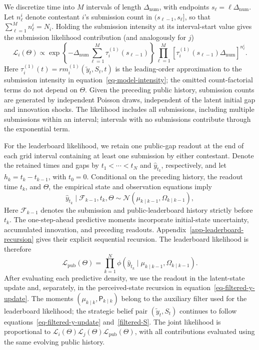 \documentclass[mnsc]{informs3}
\begin{document}
{We discretize time into $M$ intervals of length $\Delta_{\mathrm{num}}$, with endpoints $s_\ell=\ell\Delta_{\mathrm{num}}$. Let $n^i_\ell$ denote contestant $i$'s submission count in $(s_{\ell-1},s_\ell]$, so that $\sum_{\ell=1}^M n^i_\ell=N_i$. Holding the submission intensity at its interval-start value gives the submission likelihood contribution (and analogously for $j$)}
\begin{equation}\label{eq-ihpp-prob}
{\mathcal L_i(\Theta)
\propto
\exp\!\left\{-\Delta_{\mathrm{num}}\sum_{\ell=1}^M\tau_i^{(1)}(s_{\ell-1})\right\}
\prod_{\ell=1}^M
\left[\tau_i^{(1)}(s_{\ell-1})\Delta_{\mathrm{num}}\right]^{n^i_\ell}.}
\end{equation}
{Here $\tau_i^{(1)}(t)=r m_i^{(1)}(\tilde y_t,S_t,t)$ is the leading-order approximation to the submission intensity in equation~\eqref{eq-model-intensity}; the omitted count-factorial terms do not depend on $\Theta$. Given the preceding public history, submission counts are generated by independent Poisson draws, independent of the latent initial gap and innovation shocks. The likelihood includes all submissions, including multiple submissions within an interval; intervals with no submissions contribute through the exponential term.}

For the leaderboard likelihood, we retain one public-gap readout at the end of each grid interval containing at least one submission by either contestant. Denote the retained times and gaps by $t_1<\cdots<t_N$ and $\hat y_{t_k}$, respectively, and let $h_k=t_k-t_{k-1}$, with $t_0=0$. Conditional on the preceding history, the readout time $t_k$, and $\Theta$, the empirical state and observation equations imply
\[
{\hat y_{t_k}\mid\mathcal F_{k-1},t_k,\Theta}
\sim
\mathcal N\!\left(\mu_{k\mid k-1},\Omega_{k\mid k-1}\right),
\]
{Here $\mathcal F_{k-1}$ denotes the submission and public-leaderboard history strictly before $t_k$. The one-step-ahead predictive moments incorporate initial-state uncertainty, accumulated innovation, and preceding readouts. Appendix~\ref{app-leaderboard-recursion} gives their explicit sequential recursion. The leaderboard likelihood is therefore}
\begin{equation}\label{eq-obs_gap-prob}
{\mathcal L_{\mathrm{pub}}(\Theta)}
=
\prod_{k=1}^N
\phi\left(\hat y_{t_k}\mid\mu_{k\mid k-1},\Omega_{k\mid k-1}\right).
\end{equation}
{After evaluating each predictive density, we use the readout in the latent-state update and, separately, in the perceived-state recursion in equation~\eqref{eq-filtered-y-update}. The moments $(\mu_{k\mid k},\mathsf P_{k\mid k})$ belong to the auxiliary filter used for the leaderboard likelihood; the strategic belief pair $(\tilde y_t,S_t)$ continues to follow equations~\eqref{eq-filtered-y-update} and~\eqref{filtered-S}. The joint likelihood is proportional to $\mathcal L_i(\Theta)\mathcal L_j(\Theta)\mathcal L_{\mathrm{pub}}(\Theta)$, with all contributions evaluated using the same evolving public history.}
\end{document}
